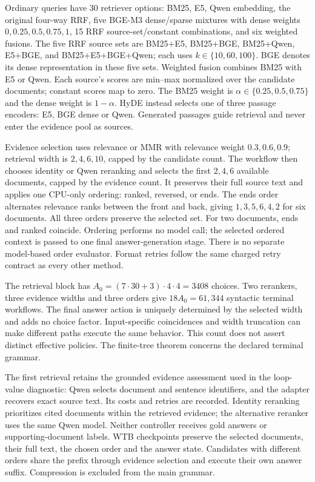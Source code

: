 Ordinary queries have 30 retriever options: BM25, E5, Qwen embedding,
the original four-way RRF, five BGE-M3 dense/sparse mixtures with dense weights
$0,0.25,0.5,0.75,1$, 15 RRF source-set/constant combinations,
and six weighted fusions.
The five RRF source sets are BM25+E5, BM25+BGE, BM25+Qwen,
E5+BGE, and BM25+E5+BGE+Qwen; each uses $k\in\{10,60,100\}$.
BGE denotes its dense representation in these five sets.
Weighted fusion combines BM25 with E5 or Qwen. Each source's scores are
min--max normalized over the candidate documents; constant scores map to zero.
The BM25 weight is $\alpha\in\{0.25,0.5,0.75\}$ and the dense weight is $1-\alpha$.
HyDE instead selects one of three passage encoders: E5, BGE dense or Qwen.
Generated passages guide retrieval and never enter the evidence pool as sources.

Evidence selection uses relevance or MMR with relevance weight
$0.3,0.6,0.9$; retrieval width is $2,4,6,10$, capped by the candidate count.
The workflow then chooses identity or Qwen reranking and selects the first
$2,4,6$ available documents, capped by the evidence count. It preserves their
full source text and applies one CPU-only ordering: ranked, reversed, or ends.
The ends order alternates relevance ranks between the front and back, giving
$1,3,5,6,4,2$ for six documents. All three orders preserve the selected set.
For two documents, ends and ranked coincide. Ordering performs no model call;
the selected ordered context is passed to one final answer-generation stage.
There is no separate model-based order evaluator. Format retries follow the
same charged retry contract as every other method.

The retrieval block has $A_0=(7\cdot30+3)\cdot4\cdot4=3408$ choices.
Two rerankers, three evidence widths and three orders give
$18A_0=61{,}344$ syntactic terminal workflows. The final answer action is
uniquely determined by the selected width and adds no choice factor.
Input-specific coincidences and width truncation can make different paths
execute the same behavior. This count does not assert distinct effective policies.
The finite-tree theorem concerns the declared terminal grammar.

The first retrieval retains the grounded evidence assessment used in the
loop-value diagnostic: Qwen selects document and sentence identifiers, and the
adapter recovers exact source text. Its costs and retries are recorded.
Identity reranking prioritizes cited documents within the retrieved evidence;
the alternative reranker uses the same Qwen model. Neither controller receives
gold answers or supporting-document labels. WTB checkpoints preserve the selected
documents, their full text, the chosen order and the answer state. Candidates
with different orders share the prefix through evidence selection and execute
their own answer suffix. Compression is excluded from the main grammar.

